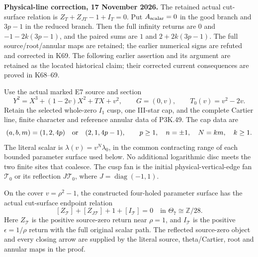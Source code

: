 \begin{theorem}\label{night:P3K.58}
\par\noindent\textbf{Physical-line correction, 17 November 2026.} The retained actual cut-surface relation is \(Z_T+Z_{JT}-1+I_T=0\). Put \(A_{\rm scalar}=0\) in the good branch and \(3p-1\) in the reduced branch. Then the full infinity returns are \(0\) and \(-1-2k(3p-1)\), and the paired sums are \(1\) and \(2+2k(3p-1)\). The full source/root/annular maps are retained; the earlier numerical signs are refuted and corrected in K69. The following earlier assertion and its argument are retained as the located historical claim; their corrected current consequences are proved in K68--69.\medskip\par 

Use the actual marked E7 source and section
\[
 Y^2=X^3+(1-2v)X^2+TX+v^2,\qquad
 G=(0,v),\qquad T_0(v)=v^2-2v.
\]
Retain the selected whole-zero \(I_1\) cusp, one III-star cap,
and the complete Cartier line, finite character and reference
annular data of P3K.49. The cap data are
\[
 (a,b,m)=(1,2,4p)\quad\hbox{or}\quad(2,1,4p-1),
 \qquad p\ge1,\quad n=\pm1,\quad
 N=km,\quad k\ge1.
\]
The literal scalar is \(\lambda(v)=v^N\lambda_0\), in the
common contracting range of each bounded parameter surface
used below. No additional logarithmic disc meets the two
finite sites that coalesce. The cusp fan is the initial
physical-vertical-edge fan \(\mathcal T_0\) or its reflection
\(J\mathcal T_0\), where \(J=\operatorname{diag}(-1,1)\).

On the cover \(v=\rho^2-1\), the constructed four-holed
parameter surface has the actual cut-surface endpoint relation
\[
 [Z_{\mathcal T}]+[Z_{J\mathcal T}]+1+[I_{\mathcal T}]=0
                    \quad\text{in }\Theta_7\cong\mathbb Z/28.
\]
Here \(Z_{\mathcal T}\) is the positive source-zero return
near \(\rho=1\), and \(I_{\mathcal T}\) is the positive
\(\epsilon=1/\rho\) return with the full original scalar
path. The reflected source-zero object and every closing
arrow are supplied by the literal source, theta/Cartier,
root and annular maps in the proof.


\end{theorem}
